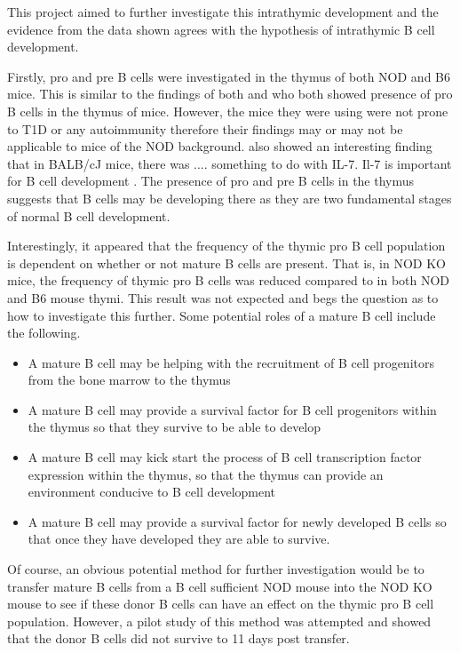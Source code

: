This project aimed to further investigate this intrathymic development and the evidence from the data shown agrees with the hypothesis of intrathymic B cell development.

Firstly, pro and pre B cells were investigated in the thymus of both NOD and B6 mice. 
This is similar to the findings of both \citet{Hashimoto2002} and \citet{Akashi2000} who both showed presence of pro B cells in the thymus of mice.
However, the mice they were using were not prone to T1D or any autoimmunity therefore their findings may or may not be applicable to mice of the NOD background.
\citet{Hashimoto2002} also showed an interesting finding that in BALB/cJ mice, there was .... something to do with IL-7.
Il-7 is important for B cell development \citep{Corfe2012}.
The presence of pro and pre B cells in the thymus suggests that B cells may be developing there as they are two fundamental stages of normal B cell development.

Interestingly, it appeared that the frequency of the thymic pro B cell population is dependent on whether or not mature B cells are present.
That is, in NOD KO mice, the frequency of thymic pro B cells was reduced compared to in both NOD and B6 mouse thymi.
This result was not expected and begs the question as to how to investigate this further.
Some potential roles of a mature B cell include the following.
\begin{itemize}
\item A mature B cell may be helping with the recruitment of B cell progenitors from the bone marrow to the thymus
\item A mature B cell may provide a survival factor for B cell progenitors within the thymus so that they survive to be able to develop
\item A mature B cell may kick start the process of B cell transcription factor expression within the thymus, so that the thymus can provide an environment conducive to B cell development
\item A mature B cell may provide a survival factor for newly developed B cells so that once they have developed they are able to survive.
\end{itemize}

Of course, an obvious potential method for further investigation would be to transfer mature B cells from a B cell sufficient NOD mouse into the NOD KO mouse to see if these donor B cells can have an effect on the thymic pro B cell population.
However, a pilot study of this method was attempted and showed that the donor B cells did not survive to 11 days post transfer.

